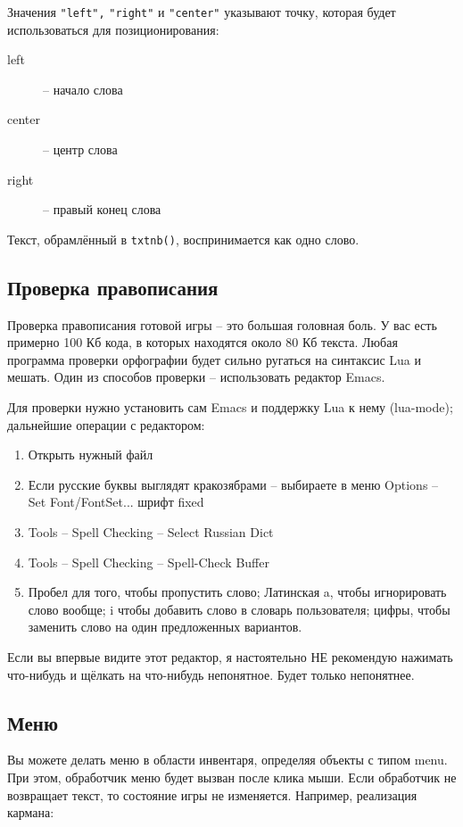 \documentclass[12pt]{article}
\begin{document}
Значения \verb/"left",/ \verb/"right"/ и \verb/"center"/ указывают точку, которая будет использоваться для позиционирования:

\begin{description}
 \item[left] -- начало слова
 \item[center] -- центр слова
 \item[right] -- правый конец слова
\end{description}

Текст, обрамлённый в \verb/txtnb()/, воспринимается как одно слово.

\subsection{Проверка правописания}
Проверка правописания готовой игры -- это большая головная боль. У вас есть примерно 100 Кб кода, в которых находятся около 80 Кб текста. Любая программа проверки орфографии будет сильно ругаться на синтаксис Lua и мешать. Один из способов проверки -- использовать редактор Emacs.

Для проверки нужно установить сам Emacs и поддержку Lua к нему (lua-mode); дальнейшие операции с редактором:

\begin{enumerate}
\item Открыть нужный файл
\item Если русские буквы выглядят кракозябрами -- выбираете в меню Options -- Set Font/FontSet... шрифт fixed
\item Tools -- Spell Checking -- Select Russian Dict
\item Tools -- Spell Checking -- Spell-Check Buffer
\item Пробел для того, чтобы пропустить слово; Латинская a, чтобы игнорировать слово вообще; i чтобы добавить слово в словарь пользователя; цифры, чтобы заменить слово на один предложенных вариантов.
\end{enumerate}

Если вы впервые видите этот редактор, я настоятельно НЕ рекомендую нажимать что-нибудь и щёлкать на что-нибудь непонятное. Будет только непонятнее.

\subsection{Меню}
Вы можете делать меню в области инвентаря, определяя объекты с типом menu. При этом, обработчик меню будет вызван после клика мыши. Если обработчик не возвращает текст, то состояние игры не изменяется. Например, реализация кармана:
\end{document}
